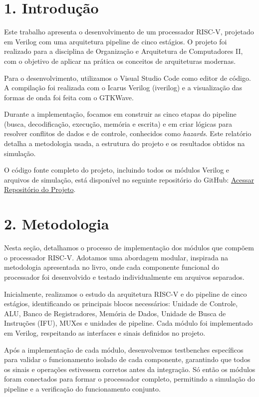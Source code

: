 \documentclass[12pt, a4paper]{article}
\begin{document}
\section*{1. Introdução}

Este trabalho apresenta o desenvolvimento de um processador RISC-V, projetado em Verilog com uma arquitetura pipeline de cinco estágios. O projeto foi realizado para a disciplina de Organização e Arquitetura de Computadores II, com o objetivo de aplicar na prática os conceitos de arquiteturas modernas.

Para o desenvolvimento, utilizamos o Visual Studio Code como editor de código. A compilação foi realizada com o Icarus Verilog (iverilog) e a visualização das formas de onda foi feita com o GTKWave.

Durante a implementação, focamos em construir as cinco etapas do pipeline (busca, decodificação, execução, memória e escrita) e em criar lógicas para resolver conflitos de dados e de controle, conhecidos como \textit{hazards}. Este relatório detalha a metodologia usada, a estrutura do projeto e os resultados obtidos na simulação.

O código fonte completo do projeto, incluindo todos os módulos Verilog e arquivos de simulação, está disponível no seguinte repositório do GitHub: \href{https://github.com/LucasLeme04/Trabalho_OAC2_RISCV}{Acessar Repositório do Projeto}.


\section*{2. Metodologia}

Nesta seção, detalhamos o processo de implementação dos módulos que compõem o processador RISC-V. Adotamos uma abordagem modular, inspirada na metodologia apresentada no livro, onde cada componente funcional do processador foi desenvolvido e testado individualmente em arquivos separados.

Inicialmente, realizamos o estudo da arquitetura RISC-V e do pipeline de cinco estágios, identificando os principais blocos necessários: Unidade de Controle, ALU, Banco de Registradores, Memória de Dados, Unidade de Busca de Instruções (IFU), MUXes e unidades de pipeline. Cada módulo foi implementado em Verilog, respeitando as interfaces e sinais definidos no projeto.

Após a implementação de cada módulo, desenvolvemos testbenches específicos para validar o funcionamento isolado de cada componente, garantindo que todos os sinais e operações estivessem corretos antes da integração. Só então os módulos foram conectados para formar o processador completo, permitindo a simulação do pipeline e a verificação do funcionamento conjunto.
\end{document}

